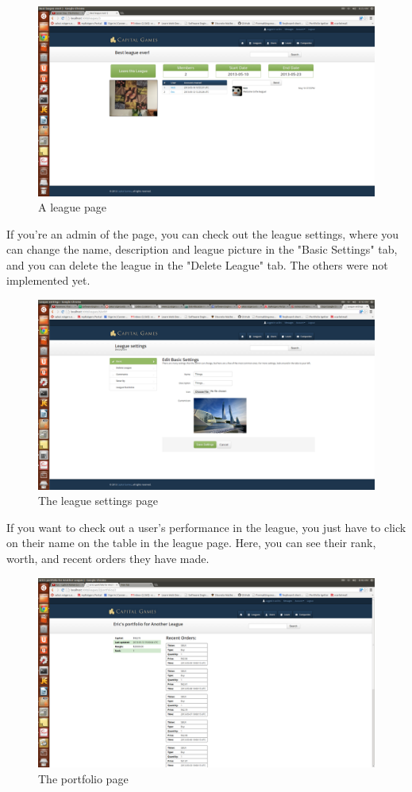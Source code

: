 \begin{figure}[H]
\centering
\includegraphics[width=5.5in]{./img/finalDesign/league.png}
\caption{A league page}
\end{figure}
If you're an admin of the page, you can check out the league settings, where you can change the name, description and league picture in the "Basic Settings" tab, and you can delete the league in the "Delete League" tab. The others were not implemented yet.
\begin{figure}[H]
\centering
\includegraphics[width=5.5in]{./img/finalDesign/leaguesettings.png}
\caption{The league settings page}
\end{figure}
If you want to check out a user's performance in the league, you just have to click on their name on the table in the league page. Here, you can see their rank, worth, and recent orders they have made.
\begin{figure}[H]
\centering
\includegraphics[width=5.5in]{./img/finalDesign/port.png}
\caption{The portfolio page}
\end{figure}
